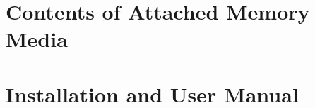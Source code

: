 

\chapter{Contents of Attached Memory Media}
\label{chap:memoryMedia}



\chapter{Installation and User Manual}
\label{chap:manual}


